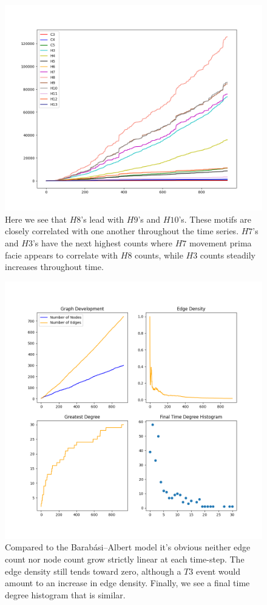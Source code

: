 \begin{figure}[h!]
    \includegraphics[width=16cm]{Images/twitter_sim_for_stats_3_0.2_0.2.png}
    \centering
    \caption{Here we see that $H8$'s lead with $H9$'s and $H10$'s. These motifs are
     closely correlated with one another throughout the time series. $H7$'s
    and $H3$'s have the next highest counts where $H7$ movement prima facie
    appears to correlate with $H8$ counts, while $H3$ counts steadily increases throughout time.}
    \label{fig:thij0202}
\end{figure}

\begin{figure}[h!]
    \includegraphics[width=14cm]{Images/twitter_sim_stats_3_0.2_0.2.png}
    \centering
    \caption{Compared to the Barabási–Albert model it's obvious neither edge count nor node
     count grow strictly linear at each time-step. The edge density still tends toward
     zero, although a $T3$ event would amount to an increase in edge density. Finally, we 
    see a final time degree histogram that is similar.}
\end{figure}

